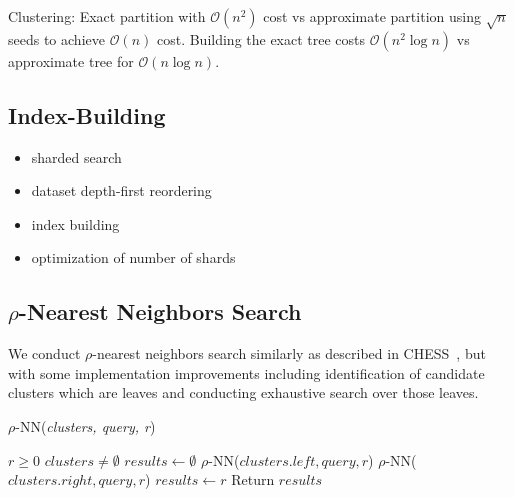 Clustering: Exact partition with $\mathcal{O}(n^2)$ cost vs approximate partition using $\sqrt{n}$ seeds to achieve $\mathcal{O}(n)$ cost.
Building the exact tree costs $\mathcal{O}(n^2 \log n)$ vs approximate tree for $\mathcal{O}(n \log n)$.


\subsection {Index-Building}
\begin{itemize}
    \item sharded search
    \item dataset depth-first reordering 
    \item index building 
    \item optimization of number of shards 
\end{itemize}

\subsection{\texorpdfstring{$\rho$}{p}-Nearest Neighbors Search}
\label{subsec:methods:rnn-search}

We conduct $\rho$-nearest neighbors search similarly as described in CHESS~\cite{ishaq2019clustered}, but 
with some implementation improvements including identification of candidate clusters which are leaves and 
conducting exhaustive search over those leaves.

\begin{algorithm} 
    \caption{$\rho$-NN(\emph{clusters, query, r})} 
    \label{alg:rnn} 
    \begin{algorithmic}[2]
        \REQUIRE $r \geq 0$
        \REQUIRE $clusters \neq \emptyset$
        \STATE $results \leftarrow \emptyset$
                \STATE $\rho$-NN($clusters.left, query, r$)
            \ENDIF
        \ENDIF
                \STATE $\rho$-NN($clusters.right, query, r$)
            \ENDIF
        \ENDIF
                    \STATE $results \leftarrow r$
                \ENDIF
            \ENDFOR
        \ENDIF
        \STATE Return $results$
    \end{algorithmic}
    \end{algorithm}

